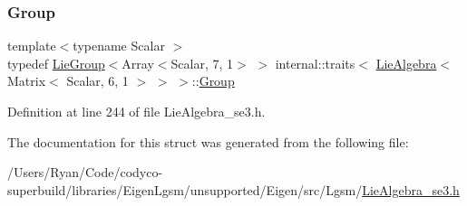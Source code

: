 \subsubsection{\texorpdfstring{Group}{Group}}
{\footnotesize\ttfamily template$<$typename Scalar $>$ \\
typedef \hyperlink{class_lie_group}{Lie\+Group}$<$Array$<$Scalar, 7, 1$>$ $>$ internal\+::traits$<$ \hyperlink{class_lie_algebra}{Lie\+Algebra}$<$ Matrix$<$ Scalar, 6, 1 $>$ $>$ $>$\+::\hyperlink{structinternal_1_1traits_3_01_lie_algebra_3_01_matrix_3_01_scalar_00_016_00_011_01_4_01_4_01_4_a2a6e55a56a1c0c3b97c50cb8598ac55a}{Group}}



Definition at line 244 of file Lie\+Algebra\+\_\+se3.\+h.



The documentation for this struct was generated from the following file\+:\begin{DoxyCompactItemize}
\item 
/\+Users/\+Ryan/\+Code/codyco-\/superbuild/libraries/\+Eigen\+Lgsm/unsupported/\+Eigen/src/\+Lgsm/\hyperlink{_lie_algebra__se3_8h}{Lie\+Algebra\+\_\+se3.\+h}\end{DoxyCompactItemize}
